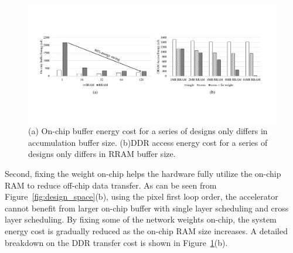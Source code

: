 \begin{figure}[t]
  \centering
  \includegraphics[width=2\columnwidth]{fig/breakdown.pdf}
  \caption{(a) On-chip buffer energy cost for a series of designs only differs in accumulation buffer size. (b)DDR access energy cost for a series of designs only differs in RRAM buffer size.}
  \label{fig:breakdown}
\end{figure}

Second, fixing the weight on-chip helps the hardware fully utilize the on-chip RAM to reduce off-chip data transfer. As can be seen from Figure~\ref{fig:design_space}(b), using the pixel first loop order, the accelerator cannot benefit from larger on-chip buffer with single layer scheduling and cross layer scheduling. By fixing some of the network weights on-chip, the system energy cost is gradually reduced as the on-chip RAM size increases. A detailed breakdown on the DDR transfer cost is shown in Figure~\ref{fig:breakdown}(b).



